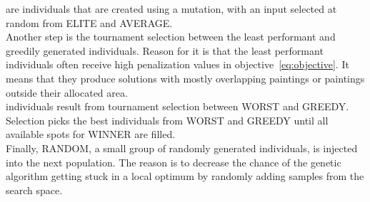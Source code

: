  are individuals that are created using a mutation,
with an input selected at random from ELITE and AVERAGE.\\

Another step is the tournament selection between the least performant and greedily generated individuals.
Reason for it is that the least performant individuals often receive high penalization
values in objective~\ref{eq:objective}.
It means that they produce solutions with mostly overlapping paintings
or paintings outside their allocated area.
\\

 individuals result from tournament selection between WORST and GREEDY.
Selection picks the best individuals from WORST and GREEDY until all available spots for WINNER are filled. \\

Finally, RANDOM, a small group of randomly generated individuals, is injected into the next population.
The reason is to decrease the chance of the genetic algorithm getting stuck in a local optimum
by randomly adding samples from the search space.
